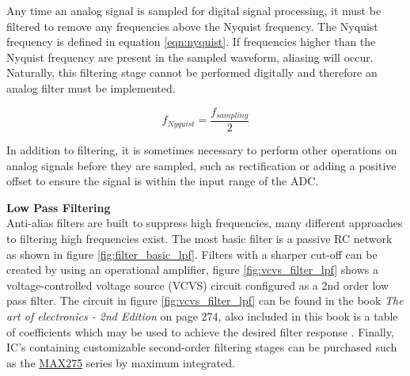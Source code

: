 Any time an analog signal is sampled for digital signal processing, it must be filtered to remove any frequencies above the Nyquist frequency. The Nyquist frequency is defined in equation \ref{eqn:nyquist}. If frequencies higher than the Nyquist frequency are present in the sampled waveform, aliasing will occur. Naturally, this filtering stage cannot be performed digitally and therefore an analog filter must be implemented.

\begin{equation}
	f_{Nyquist} = \frac{f_{sampling}}{2}
	\label{eqn:nyquist}
\end{equation}


In addition to filtering, it is sometimes necessary to perform other operations on analog signals before they are sampled, such as rectification or adding a positive offset to ensure the signal is within the input range of the ADC.

\textbf{Low Pass Filtering}\\
Anti-alias filters are built to suppress high frequencies, many different approaches to filtering high frequencies exist. The most basic filter is a passive RC network as shown in figure \ref{fig:filter_basic_lpf}. Filters with a sharper cut-off can be created by using an operational amplifier, figure \ref{fig:vcvs_filter_lpf} shows a voltage-controlled voltage source (VCVS) circuit configured as a 2nd order low pass filter. The circuit in figure \ref{fig:vcvs_filter_lpf} can be found in the book \textit{The art of electronics - 2nd Edition} on page 274, also included in this book is a table of coefficients which may be used to achieve the desired filter response \cite{Horowitz1995}. Finally, IC's containing customizable second-order filtering stages can be purchased such as the \href{https://www.maximintegrated.com/en/products/analog/analog-filters/MAX275.html/tb_tab0}{MAX275} series by maximum integrated.

